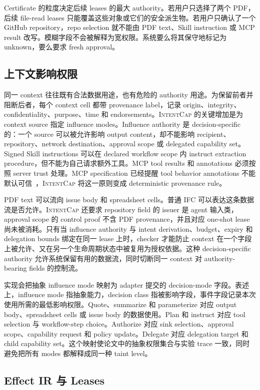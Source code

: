 \documentclass[UTF8,a4paper,11pt]{ctexart}
\newcommand{\sys}{\textsc{IntentCap}\xspace}
\begin{document}
Certificate 的粒度决定后续 leases 的最大 authority。若用户只选择了两个 PDF，后续 file-read leases 只能覆盖这些对象或它们的安全派生物。若用户只确认了一个 GitHub repository，repo selection 就不能由 PDF text、Skill instruction 或 MCP result 改写。模糊字段不会被解释为宽权限。系统要么将其保守地标记为 unknown，要么要求 fresh approval。

\subsection{上下文影响权限}

同一 context 往往既有合法数据用途，也有危险的 authority 用途。为保留前者并阻断后者，每个 context cell 都带 provenance label，记录 origin、integrity、confidentiality、purpose、time 和 endorsements。\sys 的关键增加是为 context source 指定 influence modes。Influence authority 是 decision-specific 的：一个 source 可以被允许影响 output content，却不能影响 recipient、repository、network destination、approval scope 或 delegated capability set。Signed Skill instructions 可以在 declared workflow scope 内 instruct extraction procedure，但不能为自己请求额外工具。MCP tool results 和 annotations 必须按照 server trust 处理。MCP specification 已经提醒 tool behavior annotations 不能默认可信~\cite{mcp-spec}，\sys 将这一原则变成 deterministic provenance rule。

PDF text 可以流向 issue body 和 spreadsheet cells。普通 IFC 可以表达这条数据流是否允许。\sys 还要求 repository field 的 issuer 是 agent 输入类，approval scope 的 control proof 不含 PDF provenance，并且对应 one-shot lease 尚未被消耗。只有当 influence authority 与 intent derivation、budget、expiry 和 delegation bounds 绑定在同一 lease 上时，checker 才能防止 context 在一个字段上被允许、又在另一个生命周期状态中被复用为授权依据。这种 decision-specific authority 允许系统保留有用的数据流，同时切断同一 context 对 authority-bearing fields 的控制流。

实现会把抽象 influence mode 映射为 adapter 提交的 decision-mode 字段。表述上，influence mode 指抽象能力，decision class 指被影响字段，事件字段记录本次使用所需的最低影响权限。Quote、summarize 和 parameterize 对应 output body、spreadsheet cells 或 issue body 的数据使用。Plan 和 instruct 对应 tool selection 与 workflow-step choice。Authorize 对应 sink selection、approval scope、capability request 和 policy update。Delegate 对应 delegation target 和 child capability set。这个映射使论文中的抽象权限集合与实验 trace 一致，同时避免把所有 modes 都解释成同一种 taint level。

\subsection{Effect IR 与 Leases}
\end{document}
